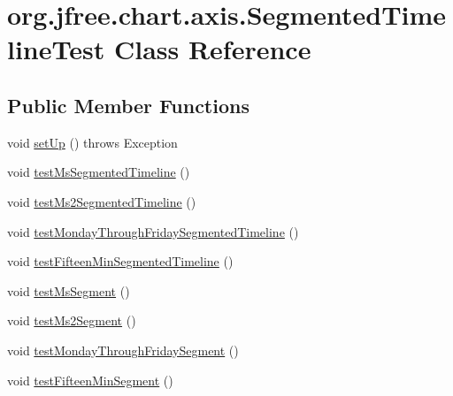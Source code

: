 \hypertarget{classorg_1_1jfree_1_1chart_1_1axis_1_1_segmented_timeline_test}{}\section{org.\+jfree.\+chart.\+axis.\+Segmented\+Timeline\+Test Class Reference}
\label{classorg_1_1jfree_1_1chart_1_1axis_1_1_segmented_timeline_test}
\subsection*{Public Member Functions}
\begin{DoxyCompactItemize}
\item 
void \mbox{\hyperlink{classorg_1_1jfree_1_1chart_1_1axis_1_1_segmented_timeline_test_a5380d48e6ed9c9d59eb23b9269d02cca}{set\+Up}} ()  throws Exception 
\item 
void \mbox{\hyperlink{classorg_1_1jfree_1_1chart_1_1axis_1_1_segmented_timeline_test_af6b99b52b9d453780d44fad51e616311}{test\+Ms\+Segmented\+Timeline}} ()
\item 
void \mbox{\hyperlink{classorg_1_1jfree_1_1chart_1_1axis_1_1_segmented_timeline_test_a122ebaf8de16ca9372de060bce816b80}{test\+Ms2\+Segmented\+Timeline}} ()
\item 
void \mbox{\hyperlink{classorg_1_1jfree_1_1chart_1_1axis_1_1_segmented_timeline_test_af402a85899eef15ca6ae5e0c6ee31c0e}{test\+Monday\+Through\+Friday\+Segmented\+Timeline}} ()
\item 
void \mbox{\hyperlink{classorg_1_1jfree_1_1chart_1_1axis_1_1_segmented_timeline_test_a22373c9052ff77272822c74f939e6a73}{test\+Fifteen\+Min\+Segmented\+Timeline}} ()
\item 
void \mbox{\hyperlink{classorg_1_1jfree_1_1chart_1_1axis_1_1_segmented_timeline_test_af27849705ed93460db577b9f9cb4a34a}{test\+Ms\+Segment}} ()
\item 
void \mbox{\hyperlink{classorg_1_1jfree_1_1chart_1_1axis_1_1_segmented_timeline_test_a5f2ec7f675b17ac8792a7c7175e34012}{test\+Ms2\+Segment}} ()
\item 
void \mbox{\hyperlink{classorg_1_1jfree_1_1chart_1_1axis_1_1_segmented_timeline_test_a92ae6d80d7d8a7e894b3c8a29f612251}{test\+Monday\+Through\+Friday\+Segment}} ()
\item 
void \mbox{\hyperlink{classorg_1_1jfree_1_1chart_1_1axis_1_1_segmented_timeline_test_acc1a67ce4f03abc65f5e6c0d5277b066}{test\+Fifteen\+Min\+Segment}} ()

\end{DoxyCompactItemize}
